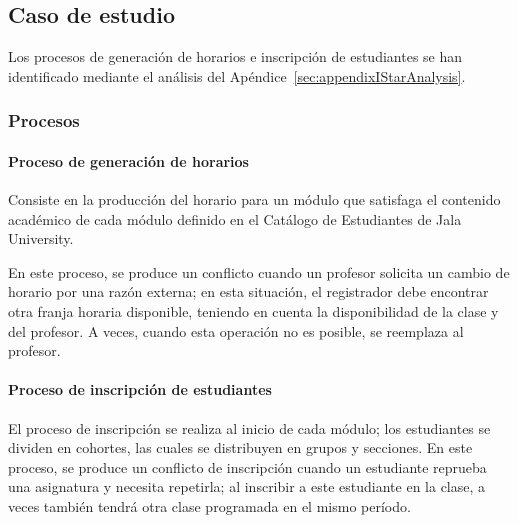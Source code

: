 \subsection{Caso de estudio}
Los procesos de generación de horarios e inscripción de estudiantes se han identificado mediante el análisis del Apéndice~\ref{sec:appendixIStarAnalysis}.

\subsubsection{Procesos}
\paragraph{Proceso de generación de horarios}
Consiste en la producción del horario para un módulo que satisfaga el contenido académico de cada módulo definido en el Catálogo de Estudiantes de Jala University.

En este proceso, se produce un conflicto cuando un profesor solicita un cambio de horario por una razón externa; en esta situación, el registrador debe encontrar otra franja horaria disponible, teniendo en cuenta la disponibilidad de la clase y del profesor.
A veces, cuando esta operación no es posible, se reemplaza al profesor.

\paragraph{Proceso de inscripción de estudiantes}
El proceso de inscripción se realiza al inicio de cada módulo; los estudiantes se dividen en cohortes, las cuales se distribuyen en grupos y secciones.
En este proceso, se produce un conflicto de inscripción cuando un estudiante reprueba una asignatura y necesita repetirla; al inscribir a este estudiante en la clase, a veces también tendrá otra clase programada en el mismo período.

